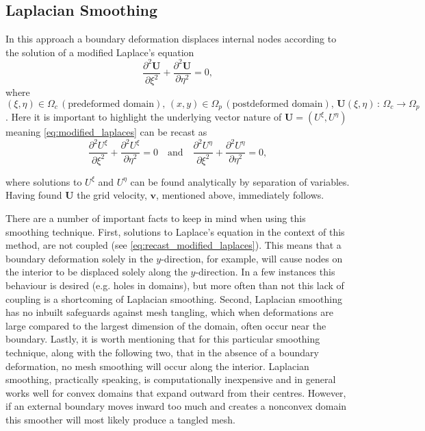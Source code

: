 \subsection{Laplacian Smoothing}
In this approach \citep{buell1973,field} a boundary deformation displaces internal nodes according to the solution of a modified Laplace's equation
\begin{equation}
\label{eq:modified_laplaces}
\frac{{\partial}^{2}\bm{U}}{\partial \xi^{2}} + \frac{\partial^{2}\bm{U}}{\partial \eta^{2}} = 0,
\end{equation} 
where $\left(\xi,\eta\right) \in \Omega_{c}\,(\textrm{predeformed domain}),\,\left(x,y\right) \in \Omega_{p}\,(\textrm{postdeformed domain}),\, \bm{U}\left(\xi,\eta\right)\,:\,\Omega_{c} \to \Omega_{p}$. Here it is important to highlight the underlying vector nature of $\bm{U}=\left(U^{\xi},U^{\eta}\right)$ meaning \ref{eq:modified_laplaces} can be recast as
\begin{equation}
\label{eq:recast_modified_laplaces}
\frac{\partial^{2}U^{\xi}}{\partial \xi^{2}} + \frac{\partial^{2}U^{\xi}}{\partial \eta^{2}} = 0\quad \textrm{and}\quad \frac{\partial^{2}U^{\eta}}{\partial \xi^{2}} + \frac{\partial^{2}U^{\eta}}{\partial \eta^{2}}=0,
\end{equation} 

where solutions to $U^{\xi}$ and $U^{\eta}$ can be found analytically by separation of variables.  Having found $\bm{U}$ the grid velocity, $\bm{v}$, mentioned above, immediately follows.
  
There are a number of important facts to keep in mind when using this smoothing technique.  First, solutions to Laplace's equation in the context of this method, are not coupled (see \ref{eq:recast_modified_laplaces}).  This means that a boundary deformation solely in the $y$-direction, for example, will cause nodes on the interior to be displaced solely along the $y$-direction.  In a few instances this behaviour is desired (e.g. holes in domains), but more often than not this lack of coupling is a shortcoming of Laplacian smoothing.  Second, Laplacian smoothing has no inbuilt safeguards against mesh tangling, which when deformations are large compared to the largest dimension of the domain, often occur near the boundary.  Lastly, it is worth mentioning that for this particular smoothing technique, along with the following two, that in the absence of a boundary deformation, no mesh smoothing will occur along the interior.  Laplacian smoothing, practically speaking, is computationally inexpensive and in general works well for convex domains that expand outward from their centres.  However, if an external boundary moves inward too much and creates a nonconvex domain this smoother will most likely produce a tangled mesh. 

